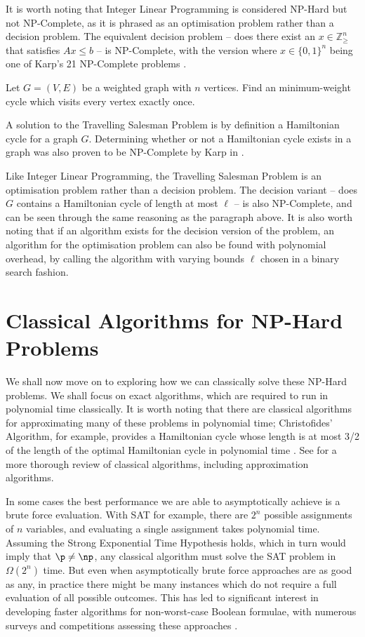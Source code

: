 It is worth noting that Integer Linear Programming is considered NP-Hard but not NP-Complete, as it is phrased as an optimisation problem rather than a decision problem. The equivalent decision problem -- does there exist an $x \in \mathbb{Z}_\geq^n$ that satisfies $Ax \leq b$ -- is NP-Complete, with the version where $x\in\{0,1\}^n$ being one of Karp's 21 NP-Complete problems \cite{karp1972}.

\begin{problem}
Let $G = (V,E)$ be a weighted graph with $n$ vertices. Find an minimum-weight cycle which visits every vertex exactly once.
\end{problem}

A solution to the Travelling Salesman Problem is by definition a Hamiltonian cycle for a graph $G$. Determining whether or not a Hamiltonian cycle exists in a graph was also proven to be NP-Complete by Karp in \cite{karp1972}.

Like Integer Linear Programming, the Travelling Salesman Problem is an optimisation problem rather than a decision problem. The decision variant -- does $G$ contains a Hamiltonian cycle of length at most $\ell$ -- is also NP-Complete, and can be seen through the same reasoning as the paragraph above. It is also worth noting that if an algorithm exists for the decision version of the problem, an algorithm for the optimisation problem can also be found with polynomial overhead, by calling the algorithm with varying bounds $\ell$ chosen in a binary search fashion.

\section{Classical Algorithms for NP-Hard Problems}
\label{sec:classical-np}

We shall now move on to exploring how we can classically solve these NP-Hard problems. We shall focus on exact algorithms, which are required to run in polynomial time classically. It is worth noting that there are classical algorithms for approximating many of these problems in polynomial time; Christofides' Algorithm, for example, provides a Hamiltonian cycle whose length is at most 3/2 of the length of the optimal Hamiltonian cycle in polynomial time \cite{christofides1976}. See \cite{garey1979} for a more thorough review of classical algorithms, including approximation algorithms.

In some cases the best performance we are able to asymptotically achieve is a brute force evaluation. With SAT for example, there are $2^n$ possible assignments of $n$ variables, and evaluating a single assignment takes polynomial time. Assuming the Strong Exponential Time Hypothesis holds, which in turn would imply that $\p \neq \np$, any classical algorithm must solve the SAT problem in $\Omega(2^n)$ time. But even when asymptotically brute force approaches are as good as any, in practice there might be many instances which do not require a full evaluation of all possible outcomes. This has led to significant interest in developing faster algorithms for non-worst-case Boolean formulae, with numerous surveys and competitions assessing these approaches \cite{sohanghpurwala2017, sat18}.

